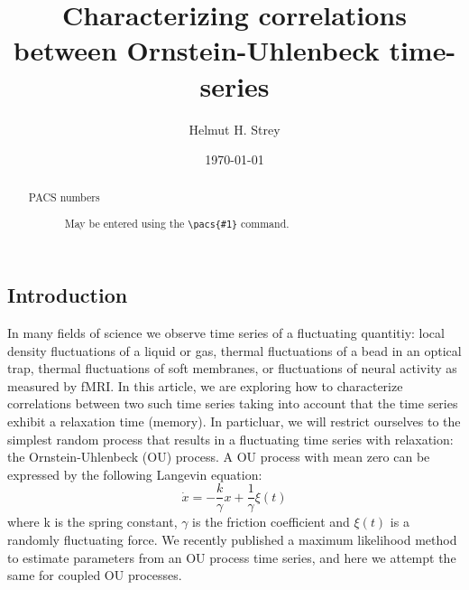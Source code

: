 \documentclass[%
 reprint,
 amsmath,amssymb,
 aps,
]{revtex4-1}
\begin{document}

\title{Characterizing correlations between Ornstein-Uhlenbeck time-series}

\author{Helmut H. Strey}

\date{\today}%

\begin{abstract}
\begin{description}
\item[PACS numbers]
May be entered using the \verb+\pacs{#1}+ command.
\end{description}
\end{abstract}

\maketitle

\onecolumngrid
\subsection{Introduction}
In many fields of science we observe time series of a fluctuating quantitiy: local density fluctuations of a liquid or gas, thermal fluctuations of a bead in an optical trap, thermal fluctuations of soft membranes, or fluctuations of neural activity as measured by fMRI.  In this article, we are exploring how to characterize correlations between two such time series taking into account that the time series exhibit a relaxation time (memory).  In particluar, we will restrict ourselves to the simplest random process that results in a fluctuating time series with relaxation: the Ornstein-Uhlenbeck (OU) process.  A OU process with mean zero can be expressed by the following Langevin equation:
\begin{equation}
\dot x =  - \frac{k}{\gamma }x + \frac{1}{\gamma }\xi(t)
\label{model}
\end{equation}
where k is the spring constant, $\gamma$ is the friction coefficient and $\xi(t)$ is a randomly fluctuating force.  
We recently published a maximum likelihood method to estimate parameters from an OU process time series, and here we attempt the same for coupled OU processes.
\end{document}

